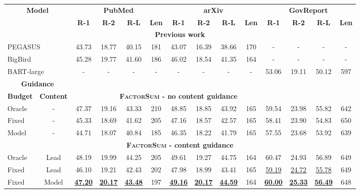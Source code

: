 \documentclass[11pt,table]{article}
\newcommand{\modelname}{FactorSum}
\begin{document}
\begin{table*}[h]
  \centering
  \setlength\tabcolsep{3.5pt}
  \begin{tabular}{lc|cccc|cccc|cccc}
    \toprule
    \multicolumn{2}{c|}{\multirow{2}{2.2cm}{\centering \textbf{Model}}} & \multicolumn{4}{c|}{\textbf{PubMed}} & \multicolumn{4}{c|}{\textbf{arXiv}} & \multicolumn{4}{c}{\textbf{GovReport}} \\
    \cmidrule(r){3-6} \cmidrule(r){7-10} \cmidrule(r){11-14} 
    &  & \textbf{R-1} & \textbf{R-2} & \textbf{R-L} & \textbf{Len} & \textbf{R-1} & \textbf{R-2} & \textbf{R-L} & \textbf{Len} & \textbf{R-1} & \textbf{R-2} & \textbf{R-L} & \textbf{Len} \\
    \toprule
    \multicolumn{14}{c}{\textbf{Previous work}} \\
    \midrule
    \multicolumn{2}{l|}{PEGASUS} & 43.73 & 18.77 & 40.15 & 181 & 43.07 & 16.39 & 38.66 & 170 & - & - & - & - \\
    \multicolumn{2}{l|}{BigBird} & 45.28 & 19.77 & 41.60 & 186 & 46.02 & 18.54 & 41.35 & 164 & - & - & - & - \\
    \multicolumn{2}{l|}{BART-large} & - & - & - & - & - & - & - & - & 53.06 & 19.11 & 50.12 & 597 \\
    \midrule
    \multicolumn{2}{c|}{\textbf{Guidance}} & \multicolumn{12}{c}{} \\
    \cmidrule(r){1-2}
    \textbf{Budget} & \textbf{Content} & \multicolumn{9}{c}{\textbf{\textsc{\modelname} - no content guidance}} \\
    \midrule
    Oracle & - & 47.37 & 19.16 & 43.33 & 210 & 48.85 & 18.85 & 43.92 & 165 & 59.54 & 23.98 & 55.82 & 642 \\
    Fixed & - & 45.33 & 18.69 & 41.62 & 205 & 47.16 & 18.57 & 42.57 & 165 & 58.41 & 23.90 & 54.83 & 650 \\
    Model & - & 44.71 & 18.07 & 40.84 & 185 & 46.35 & 18.22 & 41.79 & 165 & 57.55 & 23.68 & 53.92 & 639 \\
    \midrule
    \multicolumn{14}{c}{\textbf{\textsc{\modelname} - content guidance}} \\
    \midrule
    Oracle & Lead & 48.19 & 19.99 & 44.25 & 205 & 49.61 & 19.27 & 44.75 & 164 & 60.47 & 24.93 & 56.89 & 649 \\
    Fixed & Lead & 46.10 & 19.21 & 42.43 & 202 & 47.98 & 18.99 & 43.41 & 165 & \underline{59.19} & \underline{24.72} & \underline{55.78} & 649 \\
    Fixed & Model & \underline{\textbf{47.20}} & \underline{\textbf{20.17}} & \underline{\textbf{43.48}} & 197 & \underline{\textbf{49.16}} & \underline{\textbf{20.17}} & \underline{\textbf{44.59}} & 164 & \underline{\textbf{60.00}} & \underline{\textbf{25.33}} & \underline{\textbf{56.49}} & 648 \\

\end{tabular}
\end{table*}
\end{document}
